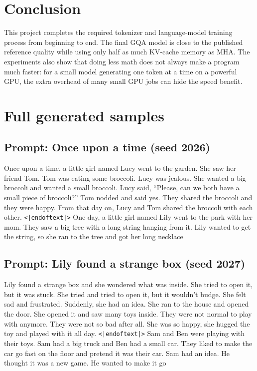 \documentclass[10pt]{article}
\begin{document}
\section{Conclusion}

This project completes the required tokenizer and language-model training process from beginning
to end. The final GQA model is close to the published reference quality while using only half as
much KV-cache memory as MHA. The experiments also show that doing less math does not always make a
program much faster: for a small model generating one token at a time on a powerful GPU, the extra
overhead of many small GPU jobs can hide the speed benefit.

\clearpage
\appendix
\section{Full generated samples}
\label{app:samples}
\small

\subsection{Prompt: Once upon a time (seed 2026)}
Once upon a time, a little girl named Lucy went to the garden. She saw her friend Tom. Tom was
eating some broccoli. Lucy was jealous. She wanted a big broccoli and wanted a small broccoli.
Lucy said, ``Please, can we both have a small piece of broccoli?'' Tom nodded and said yes. They
shared the broccoli and they were happy. From that day on, Lucy and Tom shared the broccoli with
each other. \texttt{\textless|endoftext|\textgreater} One day, a little girl named Lily went to the
park with her mom. They saw a big tree with a long string hanging from it. Lily wanted to get the
string, so she ran to the tree and got her long necklace

\subsection{Prompt: Lily found a strange box (seed 2027)}
Lily found a strange box and she wondered what was inside. She tried to open it, but it was stuck.
She tried and tried to open it, but it wouldn't budge. She felt sad and frustrated. Suddenly, she
had an idea. She ran to the house and opened the door. She opened it and saw many toys inside. They
were not normal to play with anymore. They were not so bad after all. She was so happy, she hugged
the toy and played with it all day. \texttt{\textless|endoftext|\textgreater} Sam and Ben were
playing with their toys. Sam had a big truck and Ben had a small car. They liked to make the car go
fast on the floor and pretend it was their car. Sam had an idea. He thought it was a new game. He
wanted to make it go
\end{document}
